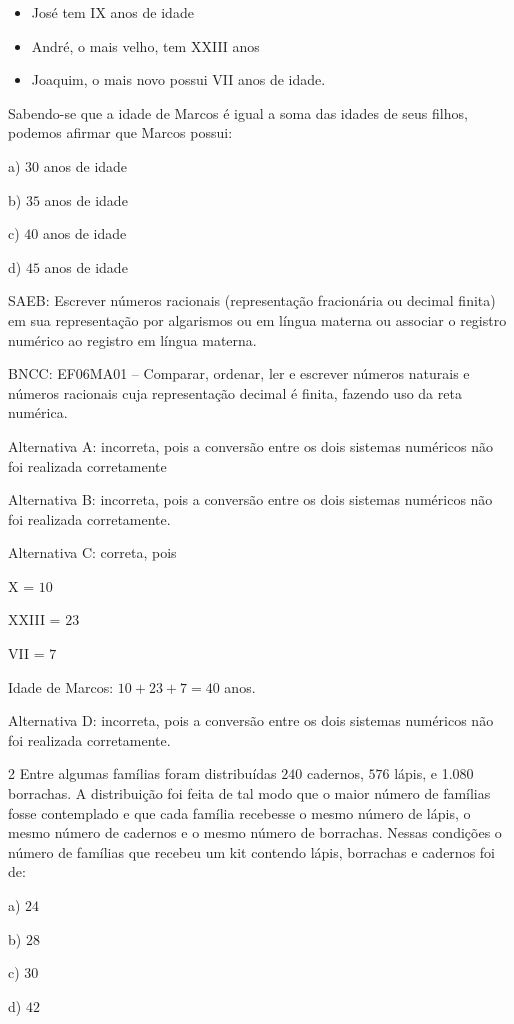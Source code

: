 \begin{itemize}
\item
  José tem IX anos de idade
\item
  André, o mais velho, tem XXIII anos
\item
  Joaquim, o mais novo possui VII anos de idade.
\end{itemize}

Sabendo-se que a idade de Marcos é igual a soma das idades de seus
filhos, podemos afirmar que Marcos possui:

a) $30$ anos de idade

b) $35$ anos de idade

c) $40$ anos de idade

d) $45$ anos de idade

SAEB: Escrever números racionais (representação fracionária ou decimal
finita) em sua representação por algarismos ou em língua materna ou
associar o registro numérico ao registro em língua materna.

BNCC: EF06MA01 -- Comparar, ordenar, ler e escrever números naturais e
números racionais cuja representação decimal é finita, fazendo uso da
reta numérica.

Alternativa A: incorreta, pois a conversão entre os dois sistemas
numéricos não foi realizada corretamente

Alternativa B: incorreta, pois a conversão entre os dois sistemas
numéricos não foi realizada corretamente.

Alternativa C: correta, pois

X = $10$

XXIII = $23$

VII = $7$

Idade de Marcos: $10 + 23 + 7 = 40$ anos.

Alternativa D: incorreta, pois a conversão entre os dois sistemas
numéricos não foi realizada corretamente.

\num{2}  Entre algumas famílias foram distribuídas $240$ cadernos, $576$ lápis, e
1.080 borrachas. A distribuição foi feita de tal modo que o maior número
de famílias fosse contemplado e que cada família recebesse o mesmo
número de lápis, o mesmo número de cadernos e o mesmo número de
borrachas. Nessas condições o número de famílias que recebeu um kit
contendo lápis, borrachas e cadernos foi de:

a) $24$

b) $28$

c) $30$

d) $42$

